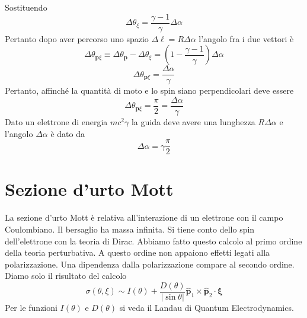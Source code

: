 Sostituendo
$$
\Delta\theta_\xi = \frac{\gamma - 1}{\gamma}\Delta\alpha
$$
Pertanto dopo aver percorso uno spazio $\Delta \ell=R\Delta \alpha$ l'angolo fra i due vettori è
$$
\Delta\theta_{\mathbf{p}\xi} \equiv \Delta\theta_{\mathbf{p}} - \Delta\theta_\xi = \left(1 - \frac{\gamma - 1}{\gamma}\right)\Delta\alpha
$$
$$
\Delta\theta_{\mathbf{p}\xi} = \frac{\Delta\alpha}{\gamma}
$$
Pertanto, affinché la quantità di moto e lo spin siano perpendicolari deve essere
$$
\Delta\theta_{\mathbf{p}\xi} = \frac{\pi}{2} = \frac{\Delta\alpha}{\gamma}
$$
Dato un elettrone di energia $mc^2\gamma$ la guida deve avere una lunghezza $R\Delta \alpha$ e l'angolo $\Delta \alpha$ è dato da
$$
\Delta\alpha = \gamma\frac{\pi}{2}
$$
\section{Sezione d'urto Mott}
La sezione d'urto Mott è relativa all'interazione di un elettrone con il campo Coulombiano. Il bersaglio ha massa infinita. Si tiene conto dello spin dell'elettrone con la teoria di Dirac. Abbiamo fatto questo calcolo al primo ordine della teoria perturbativa. A questo ordine non appaiono effetti legati alla polarizzazione. Una dipendenza dalla polarizzazione compare al secondo ordine. Diamo solo il risultato del calcolo
$$
\sigma(\theta, \xi) \sim I(\theta) + \frac{D(\theta)}{|\sin \theta|} \hat{\mathbf{p}}_1 \times \hat{\mathbf{p}}_2 \cdot \boldsymbol{\xi}
$$
Per le funzioni $I(\theta)$ e $D(\theta)$ si veda il Landau di Quantum Electrodynamics.
